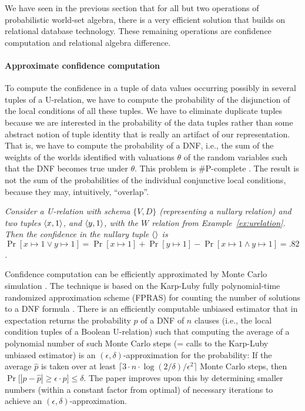 We have seen in the previous section that for all but two operations of
probabilistic world-set algebra, there is a very efficient
solution that builds on relational database technology.
These remaining operations are confidence computation and relational
algebra difference.


\paragraph{Approximate confidence computation}
%
To compute the confidence in a tuple of data values occurring possibly in several tuples
of a U-relation, we have to compute the probability of the disjunction of the local conditions of all these tuples. We have to eliminate duplicate tuples because we are interested in the  probability of the data tuples rather than some abstract notion of tuple identity that is really an artifact of our representation. That is, we have to compute the probability of a
DNF, i.e., the sum of the weights of the worlds identified with valuations $\theta$ of the random variables such that the DNF becomes true under $\theta$. This problem is \#P-complete
\cite{GGH1998,dalvi07efficient}. The result is not the sum of the probabilities of the individual conjunctive local conditions, because they may, intuitively, ``overlap''. 

\begin{example}\em
Consider
a U-relation with schema $\{V,D\}$ (representing a nullary relation) and two tuples 
$\langle x,1 \rangle$, and $\langle y,1 \rangle$, with the $W$ relation from Example~\ref{ex:urelation}.
Then the confidence in the nullary tuple $\langle  \rangle$ is $\Pr[x \mapsto 1 \lor y \mapsto 1] =
\Pr[x \mapsto 1] + \Pr[y \mapsto 1] - \Pr[x \mapsto 1 \land y \mapsto 1] = .82$.
\punto
\end{example}


Confidence computation can be efficiently approximated by Monte Carlo simulation \cite{GGH1998,dalvi07efficient,Koch2008}.
The technique is based on the Karp-Luby fully poly\-no\-mi\-al-time randomized approximation scheme (FPRAS) for counting the number of solutions to a DNF formula \cite{KL1983,KLM1989,DKLR2000}.
%
There is an efficiently computable unbiased estimator that in expectation returns the probability $p$ of a DNF of $n$ clauses (i.e., the local condition tuples of a Boolean U-relation) such that computing the average of a polynomial number of such Monte Carlo steps (= calls to the Karp-Luby unbiased estimator) is an $(\epsilon, \delta)$-approximation for the probability: If the average $\hat{p}$ is taken over at least $\lceil 3 \cdot n \cdot \log(2/\delta)/\epsilon^2 \rceil$ Monte Carlo steps, then $\Pr\big[ |p - \hat{p}| \ge \epsilon \cdot p \big] \le \delta$. The paper \cite{DKLR2000} improves upon this  by determining smaller numbers (within a constant factor from optimal) of necessary iterations to achieve an $(\epsilon, \delta)$-approximation.




